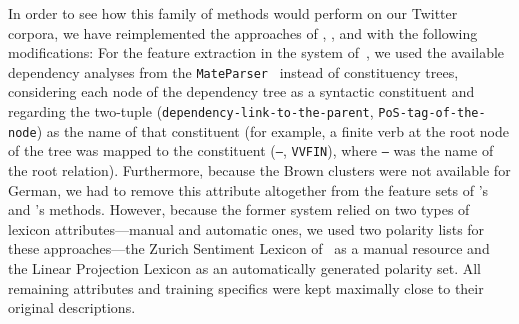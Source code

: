 In order to see how this family of methods would perform on our
Twitter corpora, we have reimplemented the approaches of
\citet{Gamon:04}, \citet{Mohammad:13}, and \citet{Guenther:14} with
the following modifications: For the feature extraction in the system
of~\citet{Gamon:04}, we used the available dependency analyses from
the \texttt{MateParser}~\cite{Bohnet:09} instead of constituency
trees, considering each node of the dependency tree as a syntactic
constituent and regarding the two-tuple
(\texttt{dependency-link-to-the-parent}, \texttt{PoS-tag-of-the-node})
as the name of that constituent (for example, a finite verb at the
root node of the tree was mapped to the constituent (\texttt{--},
\texttt{VVFIN}), where \texttt{--} was the name of the root relation).
Furthermore, because the Brown clusters were not available for German,
we had to remove this attribute altogether from the feature sets of
\citeauthor{Mohammad:13}'s and \citeauthor{Guenther:14}'s methods.
However, because the former system relied on two types of lexicon
attributes---manual and automatic ones, we used two polarity lists for
these approaches---the Zurich Sentiment Lexicon
of~\citet{Clematide:10} as a manual resource and the Linear Projection
Lexicon as an automatically generated polarity set.  All remaining
attributes and training specifics were kept maximally close to their
original descriptions.

